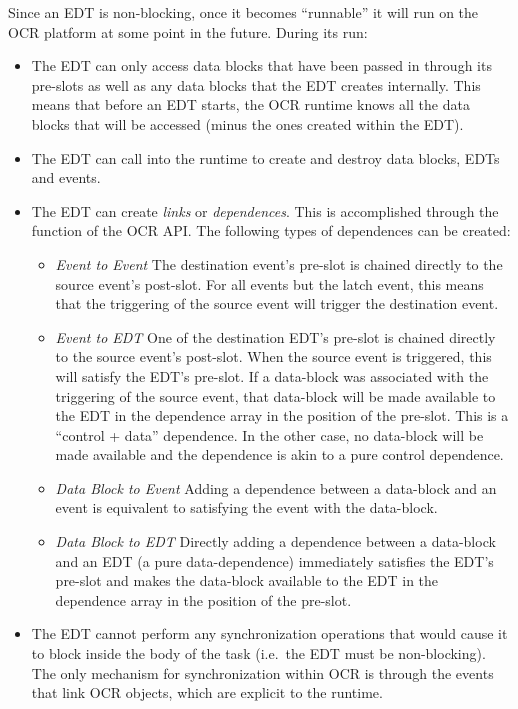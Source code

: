 Since an EDT is non-blocking, once it
becomes ``runnable'' it will run on the OCR platform at some point in the
future. During its run:
\begin{itemize}
\item The EDT can only access data blocks that have been passed in
through its pre-slots as well as any data blocks that the EDT creates
internally. This means that before an EDT starts, the OCR runtime
knows all the data blocks that will be accessed (minus the ones
created within the EDT).

\item The EDT can call into the runtime to create and destroy data
blocks, EDTs and events.

\item The EDT can create \emph{links} or \emph{dependences}. This is
accomplished through the  function of the OCR
API. The following types of dependences can be created:
\begin{itemize}
\item \emph{Event to Event} The destination event’s pre-slot is chained
directly to the source event’s post-slot.
For all events but the latch event, this means that the triggering of
the source event will trigger the destination event.

\item \emph{Event to EDT} One of the destination EDT’s pre-slot is chained
directly to the source event’s post-slot. When the source event is
triggered, this will satisfy the EDT’s pre-slot. If a data-block was
associated with the triggering of the source event, that data-block
will be made available to the EDT in the dependence array in the
position of the pre-slot. This is a “control + data” dependence. In
the other case, no data-block will be made available and the
dependence is akin to a pure control dependence.

\item \emph{Data Block to Event} Adding a dependence between a data-block and an
event is equivalent to satisfying the event with the data-block.

\item \emph{Data Block to EDT} Directly adding a dependence between a data-block and
an EDT (a pure data-dependence) immediately satisfies the EDT’s
pre-slot and makes the data-block available to the EDT in the
dependence array in the position of the pre-slot.

\end{itemize}

\item The EDT cannot perform any synchronization operations that would
cause it to block inside the body of the task (i.e.\ the EDT must be
non-blocking). The only mechanism for synchronization within OCR is
through the events that link OCR objects, which are explicit to the
runtime.

\end{itemize}

